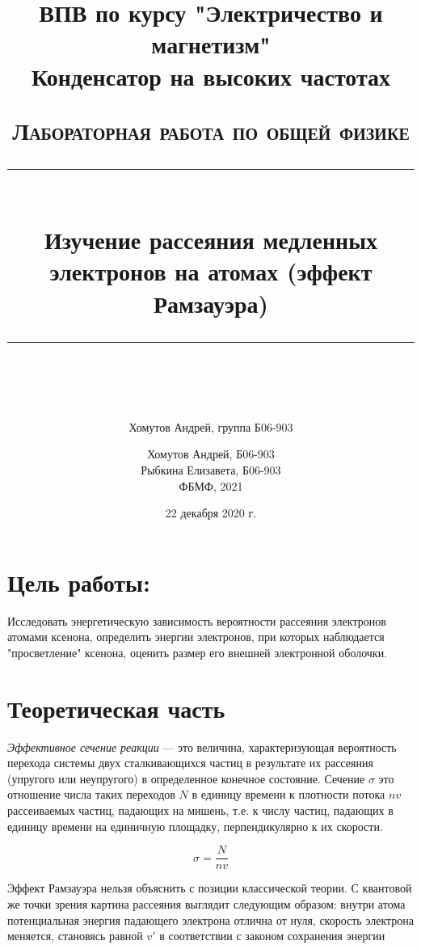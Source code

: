 \documentclass[a4paper, 12pt]{article}
\author{Хомутов Андрей, группа Б06-903}
\title{ВПВ по курсу "Электричество и магнетизм" \\ Конденсатор на высоких частотах}
\date{22 декабря 2020 г.}
\newcommand{\HRule}[1]{\rule{\linewidth}{#1}}
\begin{document}
\title{ \normalsize \textsc{Лабораторная работа по общей физике}
		\\ [4.0cm]
		\HRule{0.5pt} \\ [0.3cm]
		\LARGE \textbf{{Изучение рассеяния медленных электронов на атомах (эффект Рамзауэра)}}
		\HRule{0.5pt} \\ [0.1cm]
		\normalsize  \vspace*{18\baselineskip}}

\date{}

\author{Хомутов Андрей, Б06-903 \\
Рыбкина Елизавета, Б06-903 \\
ФБМФ, 2021\\ }

\maketitle
\thispagestyle{empty}
\newpage
\section*{Цель работы:}
Исследовать энергетическую зависимость вероятности рассеяния электронов атомами ксенона, определить энергии электронов, при которых наблюдается "просветление" ксенона, оценить размер его внешней электронной оболочки. 
 
\section{Теоретическая часть}
\textit{Эффективное сечение реакции} --- это величина, характеризующая вероятность перехода системы двух сталкивающихся частиц в результате их рассеяния (упругого или неупругого) в определенное конечное состояние. Сечение $\sigma$ это отношение числа таких переходов $N$ в единицу времени к плотности потока $nv$ рассеиваемых частиц, падающих на мишень, т.е. к числу частиц, падающих в единицу времени на единичную площадку, перпендикулярно к их скорости.

\begin{equation}
\sigma = \frac{N}{nv}
\end{equation}

Эффект Рамзауэра нельзя объяснить с позиции классической теории. С квантовой же точки зрения картина рассеяния выглядит следующим образом: внутри атома потенциальная энергия падающего электрона отлична от нуля, скорость электрона меняется, становясь равной $v'$ в соответствии с законом сохранения энергии 
\end{document}
